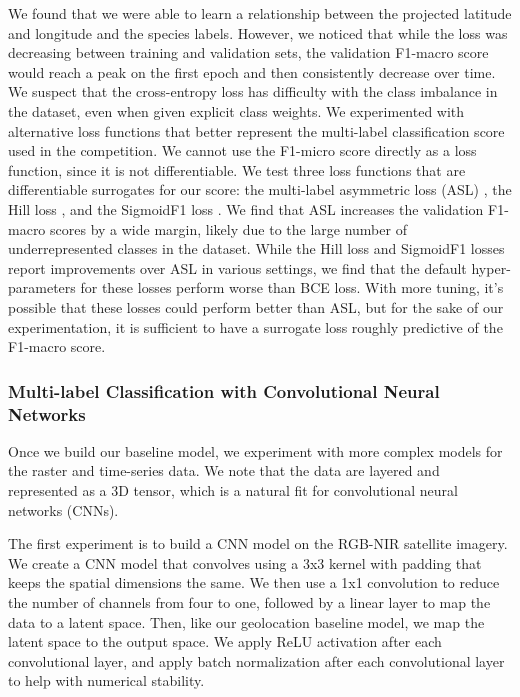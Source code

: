 We found that we were able to learn a relationship between the projected latitude and longitude and the species labels.
However, we noticed that while the loss was decreasing between training and validation sets, the validation F1-macro score would reach a peak on the first epoch and then consistently decrease over time.
We suspect that the cross-entropy loss has difficulty with the class imbalance in the dataset, even when given explicit class weights.
We experimented with alternative loss functions that better represent the multi-label classification score used in the competition.
We cannot use the F1-micro score directly as a loss function, since it is not differentiable.
We test three loss functions that are differentiable surrogates for our score: the multi-label asymmetric loss (ASL) \cite{ridnik2021asymmetric}, the Hill loss \cite{zhang2021simple}, and the SigmoidF1 loss \cite{benedict2021sigmoidf1}.
We find that ASL increases the validation F1-macro scores by a wide margin, likely due to the large number of underrepresented classes in the dataset.
While the Hill loss and SigmoidF1 losses report improvements over ASL in various settings, we find that the default hyper-parameters for these losses perform worse than BCE loss.
With more tuning, it's possible that these losses could perform better than ASL, but for the sake of our experimentation, it is sufficient to have a surrogate loss roughly predictive of the F1-macro score.

\subsubsection{Multi-label Classification with Convolutional Neural Networks}

Once we build our baseline model, we experiment with more complex models for the raster and time-series data.
We note that the data are layered and represented as a 3D tensor, which is a natural fit for convolutional neural networks (CNNs).

The first experiment is to build a CNN model on the RGB-NIR satellite imagery.
We create a CNN model that convolves using a 3x3 kernel with padding that keeps the spatial dimensions the same.
We then use a 1x1 convolution to reduce the number of channels from four to one, followed by a linear layer to map the data to a latent space.
Then, like our geolocation baseline model, we map the latent space to the output space.
We apply ReLU activation after each convolutional layer, and apply batch normalization after each convolutional layer to help with numerical stability.

